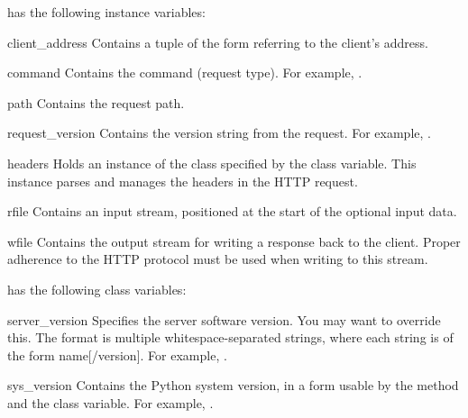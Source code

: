  has the following instance variables:

\begin{memberdesc}{client_address}
Contains a tuple of the form  referring
to the client's address.
\end{memberdesc}

\begin{memberdesc}{command}
Contains the command (request type). For example, .
\end{memberdesc}

\begin{memberdesc}{path}
Contains the request path.
\end{memberdesc}

\begin{memberdesc}{request_version}
Contains the version string from the request. For example,
.
\end{memberdesc}

\begin{memberdesc}{headers}
Holds an instance of the class specified by the 
class variable. This instance parses and manages the headers in
the HTTP request.
\end{memberdesc}

\begin{memberdesc}{rfile}
Contains an input stream, positioned at the start of the optional
input data.
\end{memberdesc}

\begin{memberdesc}{wfile}
Contains the output stream for writing a response back to the client.
Proper adherence to the HTTP protocol must be used when writing
to this stream.
\end{memberdesc}


 has the following class variables:

\begin{memberdesc}{server_version}
Specifies the server software version.  You may want to override
this.
The format is multiple whitespace-separated strings,
where each string is of the form name[/version].
For example, .
\end{memberdesc}

\begin{memberdesc}{sys_version}
Contains the Python system version, in a form usable by the
 method and the  class
variable. For example, .
\end{memberdesc}

